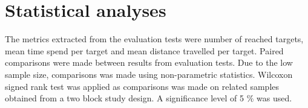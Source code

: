 \section{Statistical analyses}
The metrics extracted from the evaluation tests were number of reached targets, mean time spend per target and mean distance travelled per target. Paired comparisons were made between results from evaluation tests. Due to the low sample size, comparisons was made using non-parametric statistics. Wilcoxon signed rank test was applied as comparisons was made on related samples obtained from a two block study design. A significance level of 5 $\percent$ was used.